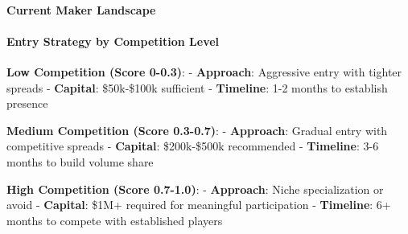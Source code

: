\hypertarget{current-maker-landscape}{%
\paragraph{\texorpdfstring{\textbf{Current Maker
Landscape}}{Current Maker Landscape}}\label{current-maker-landscape}}

\begin{Shaded}
\begin{Highlighting}[]
\OperatorTok{=}
\OperatorTok{=}\NormalTok{ \{}
        \NormalTok{: }\OperatorTok{/} \NormalTok{,  }
        \NormalTok{: } \OperatorTok{{-}} 
\NormalTok{    \}}
\end{Highlighting}
\end{Shaded}

\hypertarget{entry-strategy-by-competition-level}{%
\paragraph{\texorpdfstring{\textbf{Entry Strategy by Competition
Level}}{Entry Strategy by Competition Level}}\label{entry-strategy-by-competition-level}}

\textbf{Low Competition (Score 0-0.3)}: - \textbf{Approach}: Aggressive
entry with tighter spreads - \textbf{Capital}: \$50k-\$100k sufficient -
\textbf{Timeline}: 1-2 months to establish presence

\textbf{Medium Competition (Score 0.3-0.7)}: - \textbf{Approach}:
Gradual entry with competitive spreads - \textbf{Capital}: \$200k-\$500k
recommended - \textbf{Timeline}: 3-6 months to build volume share

\textbf{High Competition (Score 0.7-1.0)}: - \textbf{Approach}: Niche
specialization or avoid - \textbf{Capital}: \$1M+ required for
meaningful participation - \textbf{Timeline}: 6+ months to compete with
established players

